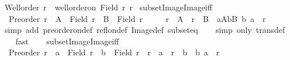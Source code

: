 \begin{isabellebody}
\ {\isachardoublequoteopen}Well{\isacharunderscore}{\kern0pt}order\ r\ {\isasymequiv}\ well{\isacharunderscore}{\kern0pt}order{\isacharunderscore}{\kern0pt}on\ {\isacharparenleft}{\kern0pt}Field\ r{\isacharparenright}{\kern0pt}\ r{\isachardoublequoteclose}\isanewline
\isanewline
\isanewline
{}\isamarkupfalse%
\ subset{\isacharunderscore}{\kern0pt}Image{\isacharunderscore}{\kern0pt}Image{\isacharunderscore}{\kern0pt}iff{\isacharcolon}{\kern0pt}\isanewline
\ \ {\isachardoublequoteopen}Preorder\ r\ {\isasymLongrightarrow}\ A\ {\isasymsubseteq}\ Field\ r\ {\isasymLongrightarrow}\ B\ {\isasymsubseteq}\ Field\ r\ {\isasymLongrightarrow}\isanewline
\ \ \ \ r\ {\isacharbackquote}{\kern0pt}{\isacharbackquote}{\kern0pt}\ A\ {\isasymsubseteq}\ r\ {\isacharbackquote}{\kern0pt}{\isacharbackquote}{\kern0pt}\ B\ {\isasymlongleftrightarrow}\ {\isacharparenleft}{\kern0pt}{\isasymforall}a{\isasymin}A{\isachardot}{\kern0pt}{\isasymexists}b{\isasymin}B{\isachardot}{\kern0pt}\ {\isacharparenleft}{\kern0pt}b{\isacharcomma}{\kern0pt}\ a{\isacharparenright}{\kern0pt}\ {\isasymin}\ r{\isacharparenright}{\kern0pt}{\isachardoublequoteclose}\isanewline
%
\isadelimproof
\ \ %
\endisadelimproof
%
\isatagproof
{}\isamarkupfalse%
\ {\isacharparenleft}{\kern0pt}simp\ add{\isacharcolon}{\kern0pt}\ preorder{\isacharunderscore}{\kern0pt}on{\isacharunderscore}{\kern0pt}def\ refl{\isacharunderscore}{\kern0pt}on{\isacharunderscore}{\kern0pt}def\ Image{\isacharunderscore}{\kern0pt}def\ subset{\isacharunderscore}{\kern0pt}eq{\isacharparenright}{\kern0pt}\isanewline
\ \ \isamarkupfalse%
\ {\isacharparenleft}{\kern0pt}simp\ only{\isacharcolon}{\kern0pt}\ trans{\isacharunderscore}{\kern0pt}def{\isacharparenright}{\kern0pt}\isanewline
\ \ \isamarkupfalse%
\ fast\isanewline
\ \ \isamarkupfalse%
%
\endisatagproof
{\isafoldproof}%
%
\isadelimproof
\isanewline
%
\endisadelimproof
\isanewline
{}\isamarkupfalse%
\ subset{\isacharunderscore}{\kern0pt}Image{}{\isacharunderscore}{\kern0pt}Image{}{\isacharunderscore}{\kern0pt}iff{\isacharcolon}{\kern0pt}\isanewline
\ \ {\isachardoublequoteopen}Preorder\ r\ {\isasymLongrightarrow}\ a\ {\isasymin}\ Field\ r\ {\isasymLongrightarrow}\ b\ {\isasymin}\ Field\ r\ {\isasymLongrightarrow}\ r\ {\isacharbackquote}{\kern0pt}{\isacharbackquote}{\kern0pt}\ {\isacharbraceleft}{\kern0pt}a{\isacharbraceright}{\kern0pt}\ {\isasymsubseteq}\ r\ {\isacharbackquote}{\kern0pt}{\isacharbackquote}{\kern0pt}\ {\isacharbraceleft}{\kern0pt}b{\isacharbraceright}{\kern0pt}\ {\isasymlongleftrightarrow}\ {\isacharparenleft}{\kern0pt}b{\isacharcomma}{\kern0pt}\ a{\isacharparenright}{\kern0pt}\ {\isasymin}\ r{\isachardoublequoteclose}\isanewline

\end{isabellebody}
